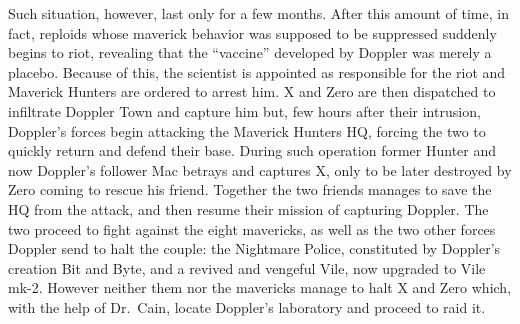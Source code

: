 Such situation, however, last only for a few months. After this amount of time, in fact, reploids whose maverick behavior was supposed to be suppressed suddenly begins to riot, revealing that the ``vaccine'' developed by Doppler was merely a placebo. Because of this, the scientist is appointed as responsible for the riot and Maverick Hunters are ordered to arrest him. X and Zero are then dispatched to infiltrate Doppler Town and capture him but, few hours after their intrusion, Doppler's forces begin attacking the Maverick Hunters HQ, forcing the two to quickly return and defend their base. During such operation former Hunter and now Doppler's follower Mac betrays and captures X, only to be later destroyed by Zero coming to rescue his friend. Together the two friends manages to save the HQ from the attack, and then resume their mission of capturing Doppler. The two proceed to fight against the eight mavericks, as well as the two other forces Doppler send to halt the couple: the Nightmare Police, constituted by Doppler's creation Bit and Byte, and a revived and vengeful Vile, now upgraded to Vile mk-2. However neither them nor the mavericks manage to halt X and Zero which, with the help of Dr.~Cain, locate Doppler's laboratory and proceed to raid it.
